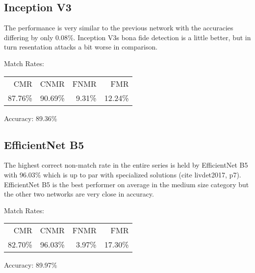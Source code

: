 \subsection{Inception V3}
\begin{minipage}[c]{0.7\textwidth}

    The performance is very similar to the previous network with the accuracies differing by only 0.08\%.
    Inception V3s bona fide detection is a little better, but in turn resentation attacks a bit worse in comparison.

    \medskip\centering Match Rates: 
    \begin{tabular}{ r  r  r  r |}
        CMR       & CNMR      & FNMR     & FMR     \\
        87.76\%   & 90.69\%   & 9.31\%   & 12.24\%  \\
    \end{tabular} \hspace{2mm} Accuracy: 89.36\%

\end{minipage}
\hfill
\begin{minipage}[c]{0.3\textwidth}

    \centering
    

\end{minipage}



\subsection{EfficientNet B5}
\begin{minipage}[c]{0.7\textwidth}

    The highest correct non-match rate in the entire series is held by EfficientNet B5 with 96.03\% which is up to par with specialized solutions (cite livdet2017, p7).
    EfficientNet B5 is the best performer on average in the medium size category but the other two networks are very close in accuracy.

    \medskip\centering Match Rates: 
    \begin{tabular}{ r  r  r  r |}
        CMR       & CNMR      & FNMR     & FMR     \\
        82.70\%   & 96.03\%   & 3.97\%   & 17.30\%  \\
    \end{tabular} \hspace{2mm} Accuracy: 89.97\%

\end{minipage}
\hfill
\begin{minipage}[c]{0.3\textwidth}
    \centering
    
\end{minipage}

